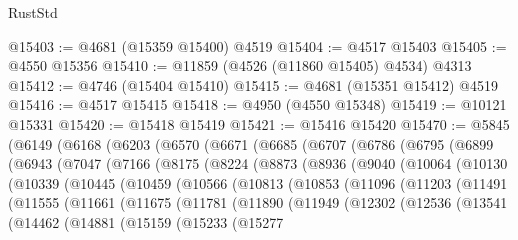 \begin{lexlean}{RustStd}
\begin{coremodule}
@15403 := @4681 (@15359 @15400) @4519
@15404 := @4517 @15403
@15405 := @4550 @15356
@15410 := @11859 (@4526 (@11860 @15405) @4534) @4313
@15412 := @4746 (@15404 @15410)
@15415 := @4681 (@15351 @15412) @4519
@15416 := @4517 @15415
@15418 := @4950 (@4550 @15348)
@15419 := @10121 @15331
@15420 := @15418 @15419
@15421 := @15416 @15420
@15470 := @5845
    (@6149
      (@6168
        (@6203
          (@6570
            (@6671
              (@6685
                (@6707
                  (@6786
                    (@6795
                      (@6899
                        (@6943
                          (@7047
                            (@7166
                              (@8175
                                (@8224
                                  (@8873
                                    (@8936
                                      (@9040
                                        (@10064
                                          (@10130
                                            (@10339
                                              (@10445
                                                (@10459
                                                  (@10566
                                                    (@10813
                                                      (@10853
                                                        (@11096
                                                          (@11203
                                                            (@11491
                                                              (@11555
                                                                (@11661
                                                                  (@11675
                                                                    (@11781
                                                                      (@11890
                                                                        (@11949
                                                                          (@12302
                                                                            (@12536
                                                                              (@13541
                                                                                (@14462
                                                                                  (@14881
                                                                                    (@15159
                                                                                      (@15233
                                                                                        (@15277

\end{coremodule}
\end{lexlean}
